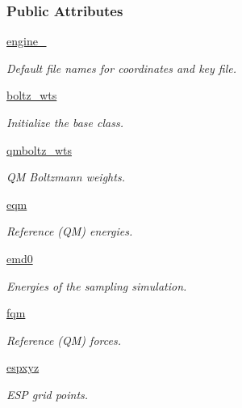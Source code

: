 \subsubsection*{Public Attributes}
\begin{DoxyCompactItemize}
\item 
\hyperlink{classforcebalance_1_1openmmio_1_1AbInitio__OpenMM_a6eea3c5ab566a09404b13fbbdceead93}{engine\-\_\-}
\begin{DoxyCompactList}\small\item\em Default file names for coordinates and key file. \end{DoxyCompactList}\item 
\hyperlink{classforcebalance_1_1abinitio_1_1AbInitio_ac442f096d11d0294235f2c8cbe1dcbb4}{boltz\-\_\-wts}
\begin{DoxyCompactList}\small\item\em Initialize the base class. \end{DoxyCompactList}\item 
\hyperlink{classforcebalance_1_1abinitio_1_1AbInitio_a06ec6b12d81791ca94f599f41e56335a}{qmboltz\-\_\-wts}
\begin{DoxyCompactList}\small\item\em Q\-M Boltzmann weights. \end{DoxyCompactList}\item 
\hyperlink{classforcebalance_1_1abinitio_1_1AbInitio_a64387fae9bdfb0d03ca6961e67c779be}{eqm}
\begin{DoxyCompactList}\small\item\em Reference (Q\-M) energies. \end{DoxyCompactList}\item 
\hyperlink{classforcebalance_1_1abinitio_1_1AbInitio_af928d333d14cb3b93f7db78530455873}{emd0}
\begin{DoxyCompactList}\small\item\em Energies of the sampling simulation. \end{DoxyCompactList}\item 
\hyperlink{classforcebalance_1_1abinitio_1_1AbInitio_af025be2ce97da3e8dc876d70e403f4ef}{fqm}
\begin{DoxyCompactList}\small\item\em Reference (Q\-M) forces. \end{DoxyCompactList}\item 
\hyperlink{classforcebalance_1_1abinitio_1_1AbInitio_a8be2d088afb344036aae989ca3cbcc41}{espxyz}
\begin{DoxyCompactList}\small\item\em E\-S\-P grid points. \end{DoxyCompactList}\item 

\end{DoxyCompactItemize}
